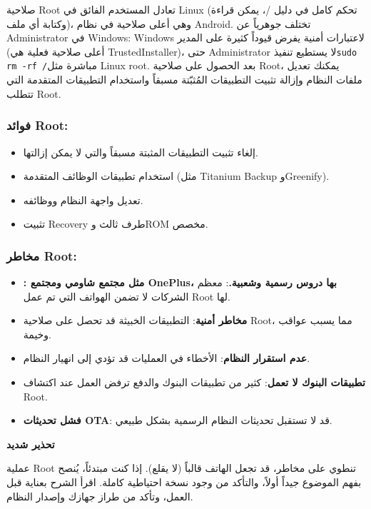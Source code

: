 
صلاحية Root تعادل المستخدم الفائق في Linux (تحكم كامل في دليل /، يمكن قراءة وكتابة أي ملف)، وهي أعلى صلاحية في نظام Android. تختلف جوهرياً عن Administrator في Windows: Windows لاعتبارات أمنية يفرض قيوداً كثيرة على المدير (أعلى صلاحية فعلية هي TrustedInstaller)، حتى Administrator لا يستطيع تنفيذ\texttt{sudo rm -\allowbreak rf /\allowbreak *}مباشرة مثل Linux root. بعد الحصول على صلاحية Root، يمكنك تعديل ملفات النظام وإزالة تثبيت التطبيقات المُثبّتة مسبقاً واستخدام التطبيقات المتقدمة التي تتطلب Root.

\subsubsection*{فوائد Root:}

\begin{itemize}
  \item إلغاء تثبيت التطبيقات المثبتة مسبقاً والتي لا يمكن إزالتها.
  \item استخدام تطبيقات الوظائف المتقدمة (مثل Titanium Backup وGreenify).
  \item تعديل واجهة النظام ووظائفه.
  \item تثبيت Recovery طرف ثالث وROM مخصص.
\end{itemize}

\subsubsection*{مخاطر Root:}

\begin{itemize}
  \item \textbf{: مثل مجتمع شاومي ومجتمع OnePlus، بها دروس رسمية وشعبية.}: معظم الشركات لا تضمن الهواتف التي تم عمل Root لها.
  \item \textbf{مخاطر أمنية}: التطبيقات الخبيثة قد تحصل على صلاحية Root، مما يسبب عواقب وخيمة.
  \item \textbf{عدم استقرار النظام}: الأخطاء في العمليات قد تؤدي إلى انهيار النظام.
  \item \textbf{تطبيقات البنوك لا تعمل}: كثير من تطبيقات البنوك والدفع ترفض العمل عند اكتشاف Root.
  \item \textbf{فشل تحديثات OTA}: قد لا تستقبل تحديثات النظام الرسمية بشكل طبيعي.
\end{itemize}

\textbf{تحذير شديد}\par

عملية Root تنطوي على مخاطر، قد تجعل الهاتف قالباً (لا يقلع). إذا كنت مبتدئاً، يُنصح بفهم الموضوع جيداً أولاً، والتأكد من وجود نسخة احتياطية كاملة. اقرأ الشرح بعناية قبل العمل، وتأكد من طراز جهازك وإصدار النظام.

